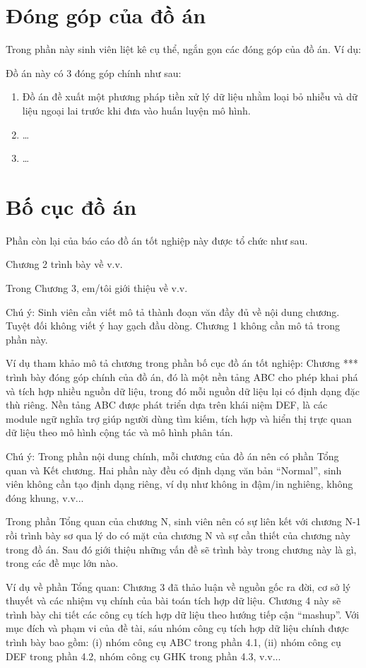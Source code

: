 \documentclass[../main.tex]{subfiles}
\begin{document}
\section{Đóng góp của đồ án}
Trong phần này sinh viên liệt kê cụ thể, ngắn gọn các đóng góp của đồ án. Ví dụ: 

Đồ án này có 3 đóng góp chính như sau:

\begin{enumerate}
\item Đồ án đề xuất một phương pháp tiền xử lý dữ liệu nhằm loại bỏ nhiễu và dữ liệu ngoại lai trước khi đưa vào huấn luyện mô hình.
\item \ldots
\item \ldots 
\end{enumerate}

\section{Bố cục đồ án}
Phần còn lại của báo cáo đồ án tốt nghiệp này được tổ chức như sau. 

Chương 2 trình bày về v.v. 

Trong Chương 3, em/tôi giới thiệu về v.v.

Chú ý: Sinh viên cần viết mô tả thành đoạn văn đầy đủ về nội dung chương. Tuyệt đối không viết ý hay gạch đầu dòng. Chương 1 không cần mô tả trong phần này. 

Ví dụ tham khảo mô tả chương trong phần bố cục đồ án tốt nghiệp: Chương *** trình bày đóng góp chính của đồ án, đó là một nền tảng ABC cho phép khai phá và tích hợp nhiều nguồn dữ liệu, trong đó mỗi nguồn dữ liệu lại có định dạng đặc thù riêng. Nền tảng ABC được phát triển dựa trên khái niệm DEF, là các module ngữ nghĩa trợ giúp người dùng tìm kiếm, tích hợp và hiển thị trực quan dữ liệu theo mô hình cộng tác và mô hình phân tán.  

Chú ý: Trong phần nội dung chính, mỗi chương của đồ án nên có phần Tổng quan và Kết chương. Hai phần này đều có định dạng văn bản “Normal”, sinh viên không cần tạo định dạng riêng, ví dụ như không in đậm/in nghiêng, không đóng khung, v.v... 

Trong phần Tổng quan của chương N, sinh viên nên có sự liên kết với chương N-1 rồi trình bày sơ qua lý do có mặt của chương N và sự cần thiết của chương này trong đồ án. Sau đó giới thiệu những vấn đề sẽ trình bày trong chương này là gì, trong các đề mục lớn nào.

Ví dụ về phần Tổng quan: Chương 3 đã thảo luận về nguồn gốc ra đời, cơ sở lý thuyết và các nhiệm vụ chính của bài toán tích hợp dữ liệu. Chương 4 này sẽ trình bày chi tiết các công cụ tích hợp dữ liệu theo hướng tiếp cận “mashup”. Với mục đích và phạm vi của đề tài, sáu nhóm công cụ tích hợp dữ liệu chính được trình bày bao gồm: (i) nhóm công cụ ABC trong phần 4.1, (ii) nhóm công cụ DEF trong phần 4.2, nhóm công cụ GHK trong phần 4.3, v.v...
\end{document}
